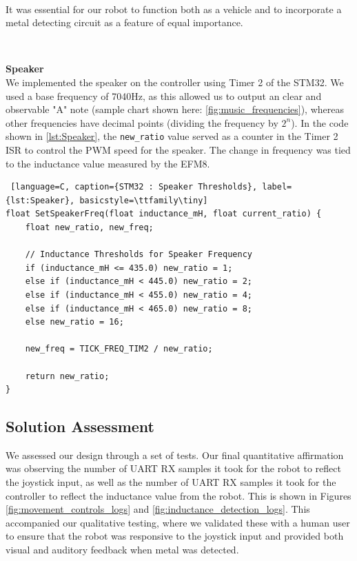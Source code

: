 \documentclass{article}
\begin{document}
\

It was essential for our robot to function both as a vehicle and to incorporate a metal detecting circuit as a feature of equal importance.

\

\textbf{Speaker} \\
We implemented the speaker on the controller using Timer 2 of the STM32. We used a base frequency of 7040Hz, as this allowed us to output an clear and observable
"A" note (sample chart shown here: \ref{fig:music_frequencies}), whereas other frequencies have decimal points (dividing the frequency by $2^n$).
In the code shown in \ref{lst:Speaker}, the \texttt{new\_ratio} value served as a counter in the Timer 2 ISR to control the PWM speed for the speaker.
The change in frequency was tied to the inductance value measured by the EFM8.

\begin{lstlisting} [language=C, caption={STM32 : Speaker Thresholds}, label={lst:Speaker}, basicstyle=\ttfamily\tiny]
float SetSpeakerFreq(float inductance_mH, float current_ratio) {
    float new_ratio, new_freq;

    // Inductance Thresholds for Speaker Frequency
    if (inductance_mH <= 435.0) new_ratio = 1;
    else if (inductance_mH < 445.0) new_ratio = 2;
    else if (inductance_mH < 455.0) new_ratio = 4;
    else if (inductance_mH < 465.0) new_ratio = 8;
    else new_ratio = 16;

    new_freq = TICK_FREQ_TIM2 / new_ratio;

    return new_ratio;
}
\end{lstlisting}

\noindent


\subsection{Solution Assessment}

We assessed our design through a set of tests. Our final quantitative affirmation was observing the number of UART RX samples it took for the robot to reflect the joystick input,
as well as the number of UART RX samples it took for the controller to reflect the inductance value from the robot. This is shown in
Figures \ref{fig:movement_controls_logs} and \ref{fig:inductance_detection_logs}. This accompanied our qualitative testing, where we validated these with a human user to ensure that the robot
was responsive to the joystick input and provided both visual and auditory feedback when metal was detected.
\end{document}
